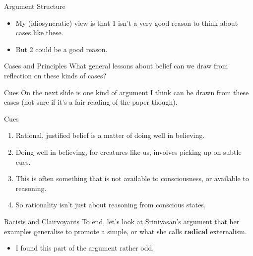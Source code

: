 \documentclass[
  17pt,
  letterpaper,
  ignorenonframetext,
  aspectratio=169,
]{beamer}
\providecommand{\tightlist}{%
  \setlength{\itemsep}{0pt}\setlength{\parskip}{0pt}}\usepackage{longtable,booktabs,array}
\begin{document}
\begin{frame}{Argument Structure}
\protect\hypertarget{argument-structure-1}{}
\begin{itemize}[<+->]
\tightlist
\item
  My (idiosyncratic) view is that 1 isn't a very good reason to think
  about cases like these.
\item
  But 2 could be a good reason.
\end{itemize}
\end{frame}

\begin{frame}{Cases and Principles}
\protect\hypertarget{cases-and-principles}{}
What general lessons about belief can we draw from reflection on these
kinds of cases?
\end{frame}

\begin{frame}{Cues}
\protect\hypertarget{cues}{}
On the next slide is one kind of argument I think can be drawn from
these cases (not sure if it's a fair reading of the paper though).
\end{frame}

\begin{frame}{Cues}
\protect\hypertarget{cues-1}{}
\begin{enumerate}[<+->]
\tightlist
\item
  Rational, justified belief is a matter of doing well in believing.
\item
  Doing well in believing, for creatures like us, involves picking up on
  subtle cues.
\item
  This is often something that is not available to consciousness, or
  available to reasoning.
\item
  So rationality isn't just about reasoning from conscious states.
\end{enumerate}
\end{frame}

\begin{frame}{Racists and Clairvoyants}
\protect\hypertarget{racists-and-clairvoyants}{}
To end, let's look at Srinivasan's argument that her examples generalise
to promote a simple, or what she calls \textbf{radical} externalism.

\begin{itemize}[<+->]
\tightlist
\item
  I found this part of the argument rather odd.
\end{itemize}
\end{frame}
\end{document}
